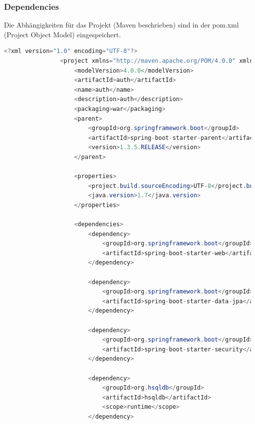        \subsubsection{Dependencies}
        Die Abhängigkeiten für das Projekt (Maven beschrieben) sind in der pom.xml (Project Object Model) eingespeichert.
            \begin{lstlisting}[language = java]
                <?xml version="1.0" encoding="UTF-8"?>
                <project xmlns="http://maven.apache.org/POM/4.0.0" xmlns:xsi="http://www.w3.org/2001/XMLSchema-instance" xsi:schemaLocation="http://maven.apache.org/POM/4.0.0 http://maven.apache.org/xsd/maven-4.0.0.xsd">
                    <modelVersion>4.0.0</modelVersion>
                    <artifactId>auth</artifactId>
                    <name>auth</name>
                    <description>auth</description>
                    <packaging>war</packaging>
                    <parent>
                        <groupId>org.springframework.boot</groupId>
                        <artifactId>spring-boot-starter-parent</artifactId>
                        <version>1.3.5.RELEASE</version>
                    </parent>
                
                    <properties>
                        <project.build.sourceEncoding>UTF-8</project.build.sourceEncoding>
                        <java.version>1.7</java.version>
                    </properties>
                
                    <dependencies>
                        <dependency>
                            <groupId>org.springframework.boot</groupId>
                            <artifactId>spring-boot-starter-web</artifactId>
                        </dependency>
                
                        <dependency>
                            <groupId>org.springframework.boot</groupId>
                            <artifactId>spring-boot-starter-data-jpa</artifactId>
                        </dependency>
                
                        <dependency>
                            <groupId>org.springframework.boot</groupId>
                            <artifactId>spring-boot-starter-security</artifactId>
                        </dependency>
                
                        <dependency>
                            <groupId>org.hsqldb</groupId>
                            <artifactId>hsqldb</artifactId>
                            <scope>runtime</scope>
                        </dependency>
                

\end{lstlisting}
